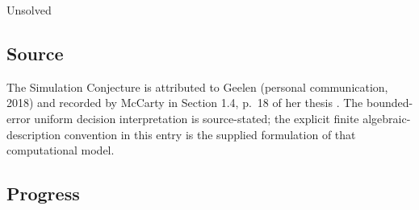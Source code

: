 Unsolved

\subsection*{Source}

The Simulation Conjecture is attributed to Geelen (personal communication, 2018) and recorded by McCarty in Section 1.4, p.~18 of her thesis . The bounded-error uniform decision interpretation is source-stated; the explicit finite algebraic-description convention in this entry is the supplied formulation of that computational model.

\subsection*{Progress}

